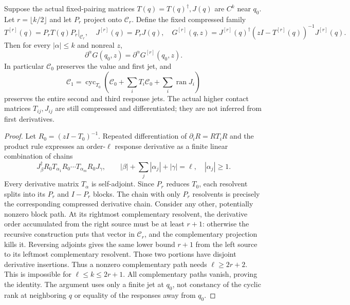 \documentclass[12pt,a4paper]{article}
\begin{document}
\begin{theorem}
\label{p4:thm:v251-finite-jet-cyclic-carrier}
Suppose the actual fixed-pairing matrices $T(q)=T(q)^\dagger,J(q)$ are
$C^k$ near $q_0$. Let $r=\lfloor k/2\rfloor$ and let $P_r$ project onto
$\mathscr C_r$. Define the fixed compressed family
\[
 T^{[r]}(q)=P_rT(q)P_r|_{\mathscr C_r},\quad
 J^{[r]}(q)=P_rJ(q),\quad
 G^{[r]}(q,z)=J^{[r]}(q)^\dagger(zI-T^{[r]}(q))^{-1}J^{[r]}(q).
\]
Then for every $|\alpha|\le k$ and nonreal $z$,
\[
 \boxed{\partial^\alpha G(q_0,z)=\partial^\alpha G^{[r]}(q_0,z).}
\]
In particular $\mathscr C_0$ preserves the value and first jet, and
\[
 \boxed{\mathscr C_1=\operatorname{cyc}_{T_0}
   \left(\mathscr C_0+\sum_iT_i\mathscr C_0
                         +\sum_i\operatorname{ran}J_i\right)}
\]
preserves the entire second and third response jets. The actual higher
contact matrices $T_{ij},J_{ij}$ are still compressed and differentiated;
they are not inferred from first derivatives.
\end{theorem}
\begin{proof}
Let $R_0=(zI-T_0)^{-1}$. Repeated differentiation of
$\partial_iR=RT_iR$ and the product rule expresses an order-$\ell$
response derivative as a finite linear combination of chains
\[
 J_\beta^\dagger R_0T_{\alpha_1}R_0\cdots
                T_{\alpha_m}R_0J_\gamma,
 \qquad |\beta|+\sum_j|\alpha_j|+|\gamma|=\ell,
 \quad |\alpha_j|\ge1.
\]
Every derivative matrix $T_\alpha$ is self-adjoint. Since $P_r$ reduces
$T_0$, each resolvent splits into its $P_r$ and $I-P_r$ blocks. The chain
with only $P_r$ resolvents is precisely the corresponding compressed
derivative chain. Consider any other, potentially nonzero block path.
At its rightmost complementary resolvent, the derivative order accumulated
from the right source must be at least $r+1$: otherwise the recursive
construction puts that vector in $\mathscr C_r$, and the complementary
projection kills it. Reversing adjoints gives the same lower bound
$r+1$ from the left source to its leftmost complementary resolvent.
Those two portions have disjoint derivative insertions. Thus a nonzero
complementary path needs $\ell\ge2r+2$. This is impossible for
$\ell\le k\le2r+1$. All complementary paths vanish, proving the identity.
The argument uses only a finite jet at $q_0$, not constancy of the cyclic
rank at neighboring $q$ or equality of the responses away from $q_0$.
\end{proof}
\end{document}

